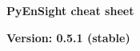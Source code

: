 \documentclass[9pt,landscape]{article}
\begin{document}
\raggedright
\footnotesize

\begin{center}
     \Huge{\textbf{PyEnSight cheat sheet}} \\
\end{center}
\begin{center}
     \small{\textbf{Version: 0.5.1 (stable)}} \\
\end{center}

\vspace{-0.3cm}
\noindent\makebox[\linewidth]{\rule{\paperwidth}{2pt}}
\end{document}
